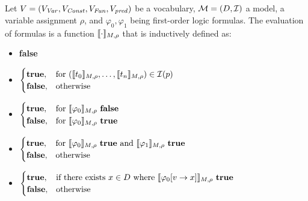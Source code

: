 \begin{mydef}
		Let $V = (V_{\mathit{Var}}, V_{\mathit{Const}}, V_{\mathit{Fun}}, V_{\mathit{pred}})$ be a vocabulary, $\mathcal{M} = (D, \mathcal{I})$ a model, a variable assignment $\rho$, and $\varphi_0, \varphi_1$ being first-order logic formulas. The evaluation of formulas is a function $\llbracket \cdot \rrbracket_{M, \rho}$ that is inductively defined as: \\
		\begin{itemize}
			\item {\makebox[3cm]{$\eval{\bot} \hfill$}} \textbf{false}
			\item {} 
				$
				\begin{cases}
					\textbf{true}, & \text{for } (\llbracket t_0 \rrbracket_{M, \rho}, \ldots, \llbracket t_n \rrbracket_{M, \rho}) \in \mathcal{I}(p)\\
					\textbf{false}, & \text{otherwise}
				\end{cases}
				$
			\item {}
				$
				\begin{cases}
					\textbf{true}, & \text{for } \llbracket \varphi_0 \rrbracket_{M, \rho} \text{ \textbf{false}}\\
					\textbf{false}, & \text{for } \llbracket \varphi_0 \rrbracket_{M, \rho} \text{ \textbf{true}}\\
				\end{cases}
				$
			\item {}
				$
				\begin{cases}
					\textbf{true}, & \text{for } \llbracket \varphi_0 \rrbracket_{M, \rho} \text{ \textbf{true} and } \llbracket \varphi_1 \rrbracket_{M, \rho} \text{ \textbf{true}} \\
					\textbf{false}, & \text{otherwise} \\
				\end{cases}
				$
			\item {}
				$
				\begin{cases}
					\textbf{true}, & \text{if there exists } x \in D \text{ where } \llbracket \varphi_0 [v \rightarrow x] \rrbracket_{M, \rho} \text{ \textbf{true}} \\
					\textbf{false}, & \text{otherwise} \\
				\end{cases}
				$
		\end{itemize}
\end{mydef}

